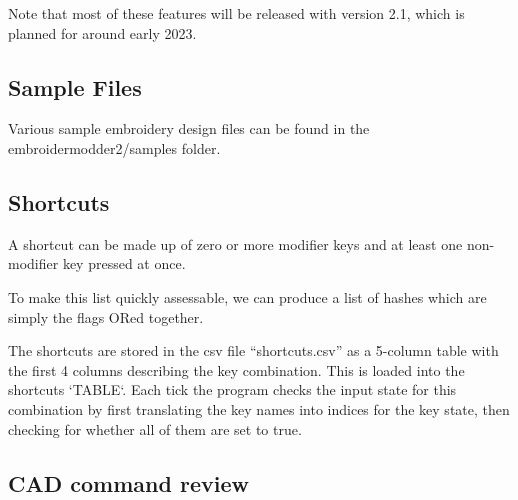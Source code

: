 \documentclass{report}
\begin{document}
Note that most of these features will be released with version 2.1, which is planned for around early 2023.

\subsection{Sample Files}

Various sample embroidery design files can be found in the embroidermodder2/samples folder.

\subsection{Shortcuts}

A shortcut can be made up of zero or more modifier keys and at least one non-modifier key pressed at once.

To make this list quickly assessable, we can produce a list of hashes which are simply the flags ORed together.

The shortcuts are stored in the csv file ``shortcuts.csv'' as a 5-column table with the first 4 columns describing the key combination. This is loaded into the shortcuts `TABLE`. Each tick the program checks the input state for this combination by first translating the key names into indices for the key state, then checking for whether all of them are set to true.

\subsection{CAD command review}
\end{document}
